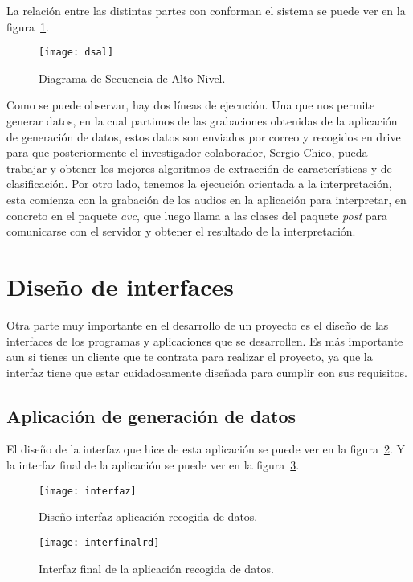 La relación entre las distintas partes con conforman el sistema se puede ver en la figura~\ref{fig:dsal}.

\begin{figure}
	\centering
	\texttt{[image: dsal]}
	\caption{Diagrama de Secuencia de Alto Nivel.}
	\label{fig:dsal}
\end{figure}

Como se puede observar, hay dos líneas de ejecución. Una que nos permite generar datos, en la cual partimos de las grabaciones obtenidas de la aplicación de generación de datos, estos datos son enviados por correo y recogidos en drive para que posteriormente el investigador colaborador, Sergio Chico, pueda trabajar y obtener los mejores algoritmos de extracción de características y de clasificación. Por otro lado, tenemos la ejecución orientada a la interpretación, esta comienza con la grabación de los audios en la aplicación para interpretar, en concreto en el paquete \textit{avc}, que luego llama a las clases del paquete \textit{post} para comunicarse con el servidor y obtener el resultado de la interpretación.
\section{Diseño de interfaces}
Otra parte muy importante en el desarrollo de un proyecto es el diseño de las interfaces de los programas y aplicaciones que se desarrollen. Es más importante aun si tienes un cliente que te contrata para realizar el proyecto, ya que la interfaz tiene que estar cuidadosamente diseñada para cumplir con sus requisitos.
\subsection{Aplicación de generación de datos}
El diseño de la interfaz que hice de esta aplicación se puede ver en la figura~\ref{fig:digd}. Y la interfaz final de la aplicación se puede ver en la figura~\ref{fig:digdfinal}.
\begin{figure}
	\centering
	\texttt{[image: interfaz]}
	\caption{Diseño interfaz aplicación recogida de datos.}
	\label{fig:digd}
\end{figure}

\begin{figure}
	\centering
	\texttt{[image: interfinalrd]}
	\caption{Interfaz final de la aplicación recogida de datos.}
	\label{fig:digdfinal}
\end{figure}

